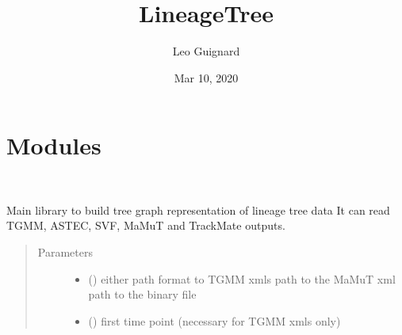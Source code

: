 \documentclass[letterpaper,10pt,english]{sphinxmanual}
\title{LineageTree}
\date{Mar 10, 2020}
\author{Leo Guignard}
\begin{document}
\pagestyle{empty}
\sphinxmaketitle
\pagestyle{plain}
\sphinxtableofcontents
\pagestyle{normal}
\label{\detokenize{index::doc}}



\chapter{Modules}
\label{\detokenize{index:modules}}

\begin{fulllineitems}
\label{\detokenize{index:LineageTree.lineageTree}}~

\begin{fulllineitems}
\label{\detokenize{index:LineageTree.lineageTree.__init__}}
Main library to build tree graph representation of lineage tree data
It can read TGMM, ASTEC, SVF, MaMuT and TrackMate outputs.
\begin{quote}\begin{description}
\item[{Parameters}] \leavevmode\begin{itemize}
\item {} 
 () \textendash{} either \sphinxhyphen{} path format to TGMM xmls
\sphinxhyphen{} path to the MaMuT xml
\sphinxhyphen{} path to the binary file

\item {} 
 () \textendash{} first time point (necessary for TGMM xmls only)


\end{itemize}
\end{description}
\end{quote}
\end{fulllineitems}
\end{fulllineitems}
\end{document}
